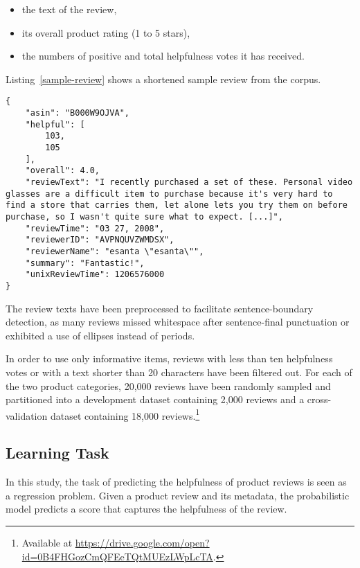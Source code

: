 \documentclass[
    a4paper,%
    12pt,%
    oneside,%
    toc=bibliography,
    final,
]{scrartcl}
\begin{document}
\begin{itemize}
\item the text of the review,
\item its overall product rating (1 to 5 stars),
\item the numbers of positive and total helpfulness votes it has received.
\end{itemize}

Listing~\ref{sample-review} shows a shortened sample review from the corpus.

\begin{lstlisting}[basicstyle=\ttfamily\small\singlespacing, caption=Sample review (shortened) from the “Electronics” category., label=sample-review, float]
{
    "asin": "B000W9OJVA",
    "helpful": [
        103,
        105
    ],
    "overall": 4.0,
    "reviewText": "I recently purchased a set of these. Personal video glasses are a difficult item to purchase because it's very hard to find a store that carries them, let alone lets you try them on before purchase, so I wasn't quite sure what to expect. [...]",
    "reviewTime": "03 27, 2008",
    "reviewerID": "AVPNQUVZWMDSX",
    "reviewerName": "esanta \"esanta\"",
    "summary": "Fantastic!",
    "unixReviewTime": 1206576000
}
\end{lstlisting}

The review texts have been preprocessed to facilitate sentence-boundary detection, as many reviews missed whitespace after sentence-final punctuation or exhibited a use of ellipses instead of periods.

In order to use only informative items, reviews with less than ten helpfulness votes or with a text shorter than 20 characters have been filtered out. For each of the two product categories, 20,000 reviews have been randomly sampled and partitioned into a development dataset containing 2,000 reviews and a cross-validation dataset containing 18,000 reviews.\footnote{Available at \url{https://drive.google.com/open?id=0B4FHGozCmQFEeTQtMUEzLWpLcTA}.}

\subsection{Learning Task}

In this study, the task of predicting the helpfulness of product reviews is seen as a regression problem. Given a product review and its metadata, the probabilistic model predicts a score that captures the helpfulness of the review.
\end{document}
